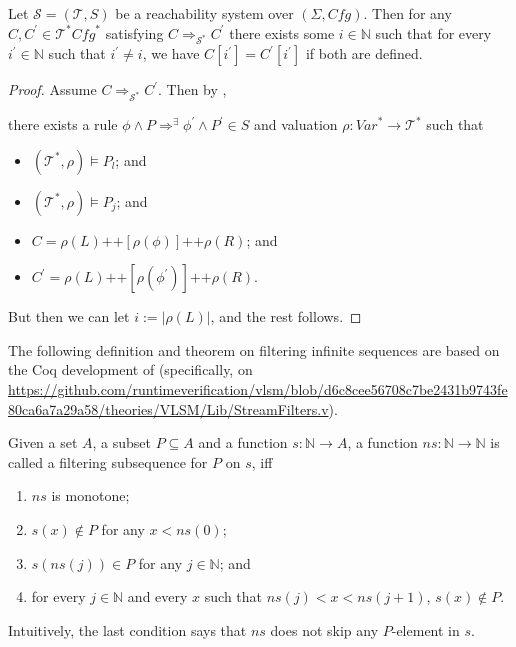 \begin{lemma}\label{lem:atMostOneComponentChanges}
    Let $\mathcal{S} = (\mathcal{T}, S)$ be a reachability system over $(\Sigma, \mathit{Cfg})$.
    Then for any $C,C^\prime \in \mathcal{T}^*{\mathit{Cfg}^*}$ satisfying $C \Rightarrow_{\mathcal{S}^*} C^\prime$
    there exists some $i \in \mathbb{N}$ such that
    for every $i^\prime \in \mathbb{N}$ such that $i^\prime \not = i$,
    we have $C[i^\prime] = C^\prime[i^\prime]$ if both are defined.
\end{lemma}
\begin{proof}
Assume $C \Rightarrow_{\mathcal{S}^*} C^\prime$.
Then by ,
\begin{proofenv}
    there exists a rule $\phi \land P \Rightarrow^\exists \phi^\prime \land P^\prime \in S$
    and valuation $\rho : \mathit{Var}^* \to \mathcal{T}^*$ such that
    \begin{itemize}
        \item $(\mathcal{T}^*, \rho) \vDash P_l$; and
        \item $(\mathcal{T}^*, \rho) \vDash P_j$; and
        \item $C = \rho(L) \texttt{++} [\rho(\phi)] \texttt{++} \rho(R)$; and
        \item $C^\prime = \rho(L) \texttt{++} [\rho(\phi^\prime)] 
        \texttt{++} \rho(R)$.
    \end{itemize}
\end{proofenv}
But then we can let $i := |\rho(L)|$, and the rest follows.
\end{proof}


The following definition and theorem on filtering infinite sequences
are based on the Coq development of \cite{ZamfirVLSM}
(specifically, on \url{https://github.com/runtimeverification/vlsm/blob/d6c8cee56708c7be2431b9743fe80ca6a7a29a58/theories/VLSM/Lib/StreamFilters.v}).
\begin{definition}\label{def:filteringSubsequence}
Given a set $A$, a subset $P \subseteq A$ and a function $s : \mathbb{N} \to A$,
a function $\mathit{ns} : \mathbb{N} \to \mathbb{N}$ is called a filtering subsequence for $P$ on $s$,
iff
\begin{enumerate}
    \item $\mathit{ns}$ is monotone;
    \item $s(x) \not \in P$ for any $x < ns(0)$;
    \item $s(\mathit{ns}(j)) \in P$ for any $j \in \mathbb{N}$; and
    \item for every $j \in \mathbb{N}$ and every $x$ such that $\mathit{ns}(j) < x < \mathit{ns}(j+1)$,
          $s(x) \not\in P$.
\end{enumerate}
Intuitively, the last condition says that $ns$ does not skip any $P$-element in $s$.
\end{definition}

